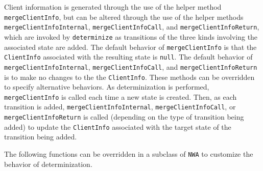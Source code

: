 Client information is generated through the use of the helper method
\texttt{mergeClientInfo}, but can be altered through the use of the helper
methods \texttt{mergeClientInfoInternal}, \texttt{mergeClientInfoCall}, and
\texttt{mergeClientInfoReturn}, which are invoked by \texttt{determinize} as
transitions of the three kinds involving the associated state are added.  The
default behavior of \texttt{mergeClientInfo} is that the \texttt{ClientInfo}
associated with the resulting state is \texttt{null}.  The default behavior
of \texttt{mergeClientInfoInternal}, \texttt{mergeClientInfoCall}, and
\texttt{mergeClientInfoReturn} is to make no changes to the the
\texttt{ClientInfo}.  These methods can be overridden to specify alternative
behaviors.  As determinization is performed, \texttt{mergeClientInfo} is
called each time a new state is created.  Then, as each transition is added,
\texttt{mergeClientInfoInternal}, \texttt{mergeClientInfoCall}, or
\texttt{mergeClientInfoReturn} is called (depending on the type of transition
being added) to update the \texttt{ClientInfo} associated with the target
state of the transition being added.

The following functions can be overridden in a subclass of \texttt{NWA} to
customize the behavior of determinization.

